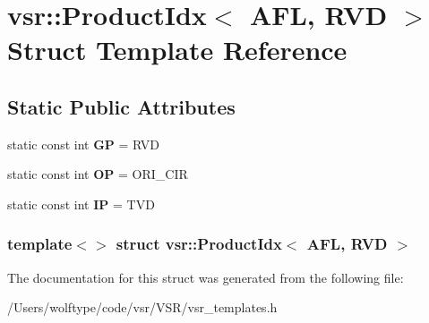\hypertarget{structvsr_1_1_product_idx_3_01_a_f_l_00_01_r_v_d_01_4}{\section{vsr\-:\-:Product\-Idx$<$ A\-F\-L, R\-V\-D $>$ Struct Template Reference}
\label{structvsr_1_1_product_idx_3_01_a_f_l_00_01_r_v_d_01_4}
}
\subsection*{Static Public Attributes}
\begin{DoxyCompactItemize}
\item 
\hypertarget{structvsr_1_1_product_idx_3_01_a_f_l_00_01_r_v_d_01_4_a29882b0d244001406d660422db1b9822}{static const int {\bfseries G\-P} = R\-V\-D}\label{structvsr_1_1_product_idx_3_01_a_f_l_00_01_r_v_d_01_4_a29882b0d244001406d660422db1b9822}

\item 
\hypertarget{structvsr_1_1_product_idx_3_01_a_f_l_00_01_r_v_d_01_4_a4eb5bb006cac9fbc57b02a9bbfd9c392}{static const int {\bfseries O\-P} = O\-R\-I\-\_\-\-C\-I\-R}\label{structvsr_1_1_product_idx_3_01_a_f_l_00_01_r_v_d_01_4_a4eb5bb006cac9fbc57b02a9bbfd9c392}

\item 
\hypertarget{structvsr_1_1_product_idx_3_01_a_f_l_00_01_r_v_d_01_4_a56628c8b07516ccd617317c3e3b37910}{static const int {\bfseries I\-P} = T\-V\-D}\label{structvsr_1_1_product_idx_3_01_a_f_l_00_01_r_v_d_01_4_a56628c8b07516ccd617317c3e3b37910}

\end{DoxyCompactItemize}
\subsubsection*{template$<$$>$ struct vsr\-::\-Product\-Idx$<$ A\-F\-L, R\-V\-D $>$}



The documentation for this struct was generated from the following file\-:\begin{DoxyCompactItemize}
\item 
/\-Users/wolftype/code/vsr/\-V\-S\-R/vsr\-\_\-templates.\-h\end{DoxyCompactItemize}
